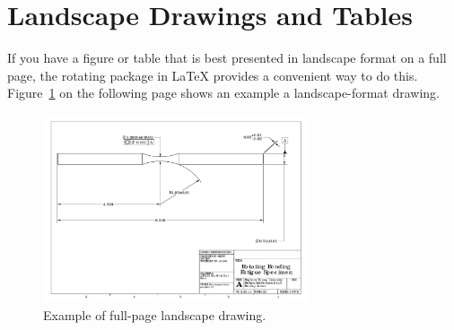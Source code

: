 \section{Landscape Drawings and Tables}
If you have a figure or table that is best presented in landscape format on a full page, the {\ttfamily rotating} package in \LaTeX{} provides a convenient way to do this. Figure~\ref{fig:landscape_dwg} on the following page shows an example a landscape-format drawing.
\begin{figure}
	\centering
	\includegraphics[width=0.7\textwidth]{figures/part_dwg_landscape.pdf}
	\caption{Example of full-page landscape drawing.}
	\label{fig:landscape_dwg}	
\end{figure}


